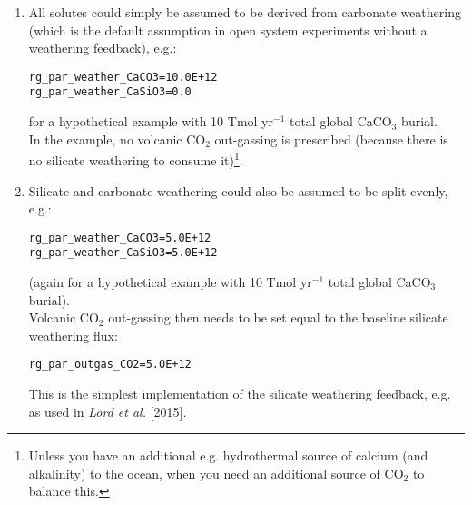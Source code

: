 \begin{enumerate}

\vspace{2mm}
\item All solutes could simply be assumed to be derived from carbonate weathering (which is the default assumption in open system experiments without a weathering feedback), e.g.:
\vspace{-1mm}\small\begin{verbatim}
rg_par_weather_CaCO3=10.0E+12
rg_par_weather_CaSiO3=0.0
\end{verbatim}\normalsize\vspace{-1mm}
for a hypothetical example with 10 Tmol yr$^{-1}$ total global CaCO$_{3}$ burial.
\\In the example, no volcanic CO$_{2}$ out-gassing is prescribed (because there is no silicate weathering to consume it)\footnote{Unless you have an additional e.g. hydrothermal source of calcium (and alkalinity) to the ocean, when you need an additional source of CO$_{2}$ to balance this.}.

\vspace{2mm}
\item Silicate and carbonate weathering could also be assumed to be split evenly, e.g.:
\vspace{-1mm}\small\begin{verbatim}
rg_par_weather_CaCO3=5.0E+12
rg_par_weather_CaSiO3=5.0E+12
\end{verbatim}\normalsize\vspace{-1mm}
(again for a hypothetical example with 10 Tmol yr$^{-1}$ total global CaCO$_{3}$ burial).
\\Volcanic CO$_{2}$ out-gassing then needs to be set equal to the baseline silicate weathering flux:
\vspace{-1mm}\small\begin{verbatim}
rg_par_outgas_CO2=5.0E+12
\end{verbatim}\normalsize\vspace{-1mm}
This is the simplest implementation of the silicate weathering feedback, e.g. as used in \textit{Lord et al.} [2015].


\end{enumerate}
